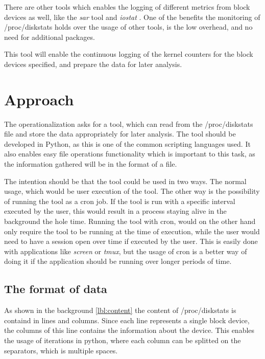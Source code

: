 There are other tools which enables the logging of different metrics from block
devices as well, like the \textit{sar} tool and \textit{iostat}
\cite{kernel:iostat}. One of the
benefits the monitoring of /proc/diskstats holds over the usage of other tools,
is the low overhead, and no need for additional packages.

This tool will enable the continuous logging of the kernel counters for the
block devices specified, and prepare the data for later analysis.

\section{Approach}

The operationalization asks for a tool, which can read from the /proc/diskstats
file and store the data appropriately for later analysis. The tool should be
developed in Python, as this is one of the common scripting languages used. It
also enables easy file operations functionality which is important to this
task, as the information gathered will be in the format of a file.

The intention should be that the tool could be used in two ways. The normal
usage, which would be user execution of the tool. The other way is the
possibility of running the tool as a cron job. If the tool is run with a
specific interval executed by the user, this would result in a process staying
alive in the background the hole time. Running the tool with cron, would on the
other hand only require the tool to be running at the time of execution, while
the user would need to have a session open over time if executed by the user.
This is easily done with applications like \textit{screen} or \textit{tmux},
but the usage of cron is a better way of doing it if the application should be
running over longer periods of time.

\subsection{The format of data}
As shown in the background \vref{lbl:content} the content of
/proc/diskstats is containd in lines and columns. Since each line represents a
single block device, the columns of this line contains the information about
the device. This enables the usage of iterations in python, where each column
can be splitted on the separators, which is multiple spaces.


